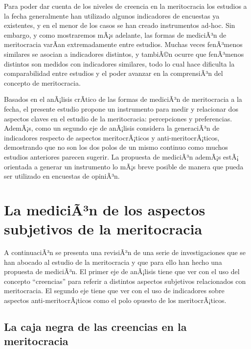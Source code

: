 \documentclass[
]{article}
\begin{document}
Para poder dar cuenta de los niveles de creencia en la meritocracia los
estudios a la fecha generalmente han utilizado algunos indicadores de
encuestas ya existentes, y en el menor de los casos se han creado
instrumentos ad-hoc. Sin embargo, y como mostraremos mÃ¡s adelante, las
formas de mediciÃ³n de meritocracia varÃ­an extremadamente entre
estudios. Muchas veces fenÃ³menos similares se asocian a indicadores
distintos, y tambiÃ©n ocurre que fenÃ³menos distintos son medidos con
indicadores similares, todo lo cual hace dificulta la comparabilidad
entre estudios y el poder avanzar en la comprensiÃ³n del concepto de
meritocracia.

Basados en el anÃ¡lisis crÃ­tico de las formas de mediciÃ³n de
meritocracia a la fecha, el presente estudio propone un instrumento para
medir y relacionar dos aspectos claves en el estudio de la meritocracia:
percepciones y preferencias. AdemÃ¡s, como un segundo eje de anÃ¡lisis
considera la generaciÃ³n de indicadores respecto de aspectos
meritocrÃ¡ticos y anti-meritocrÃ¡ticos, demostrando que no son los dos
polos de un mismo continuo como muchos estudios anteriores parecen
sugerir. La propuesta de mediciÃ³n ademÃ¡s estÃ¡ orientada a generar un
instrumento lo mÃ¡s breve posible de manera que pueda ser utilizado en
encuestas de opiniÃ³n.

\hypertarget{la-medician-de-los-aspectos-subjetivos-de-la-meritocracia}{%
\section{La mediciÃ³n de los aspectos subjetivos de la
meritocracia}\label{la-medician-de-los-aspectos-subjetivos-de-la-meritocracia}}

A continuaciÃ³n se presenta una revisiÃ³n de una serie de
investigaciones que se han abocado al estudio de la meritocracia y que
para ello han hecho una propuesta de mediciÃ³n. El primer eje de
anÃ¡lisis tiene que ver con el uso del concepto ``creencias'' para
referir a distintos aspectos subjetivos relacionados con meritocracia.
El segundo eje tiene que ver con el uso de indicadores sobre aspectos
anti-meritocrÃ¡ticos como el polo opuesto de los meritocrÃ¡ticos.

\hypertarget{la-caja-negra-de-las-creencias-en-la-meritocracia}{%
\subsection{La caja negra de las creencias en la
meritocracia}\label{la-caja-negra-de-las-creencias-en-la-meritocracia}}
\end{document}

